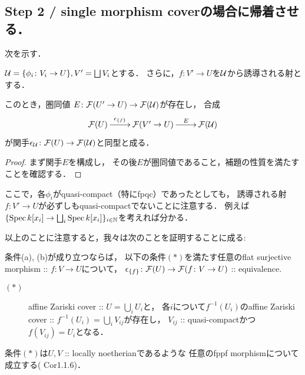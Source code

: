 \documentclass[a4paper, dvipdfmx]{jsarticle}
\begin{document}
\subsection{Step 2 / single morphism coverの場合に帰着させる．}
    次を示す．
    \begin{Lemma}
        $\mathcal{U}=\{\phi_i \colon V_i \to U\}, V'=\bigsqcup V_i$とする．
        さらに，$f \colon V' \to U$を$\mathcal{U}$から誘導される射とする．

        このとき，圏同値 $E \colon \mathcal{F}(U' \to U) \to \mathcal{F}(\mathcal{U})$が存在し，
        合成
        \[\xymatrix{
            \shF(U) \ar[r]^-{\epsilon_{\{f\}}}& \shF(V' \to U) \ar[r]^-{E}& \shF(\covU)
        }\]
        が関手$\epsilon_{\mathcal{U}} \colon \mathcal{F}(U) \to \mathcal{F}(\mathcal{U})$と同型と成る．
    \end{Lemma}

    \begin{proof}
        まず関手$E$を構成し，
        その後$E$が圏同値であること，補題の性質を満たすことを確認する．
    \end{proof}

    \begin{Remark}
        ここで，各$\phi_i$がquasi-compact（特にfpqc）であったとしても，
        誘導される射$f \colon V' \to U$が必ずしもquasi-compactでないことに注意する．
        例えば$\{\operatorname{Spec} k[x_i] \to \bigsqcup_i \operatorname{Spec} k[x_i]\}_{i \in \mathbb{N}}$を考えれば分かる．

        以上のことに注意すると，我々は次のことを証明することに成る:
        \begin{Lemma}
            条件(a), (b)が成り立つならば，
            以下の条件$(*)$を満たす任意のflat surjective morphism :: $f \colon V \to U$について，
            $\epsilon_{\{f\}} \colon \mathcal{F}(U) \to \mathcal{F}(f \colon V \to U)$ :: equivalence.
            \begin{description}
                \item[$(*)$]
                    affine Zariski cover :: $U=\bigcup_i U_i$と，
                    各$i$について$f^{-1}(U_i)$のaffine Zariski cover :: $f^{-1}(U_i)=\bigcup_i V_{ij}$が存在し，
                    $V_{ij}$ :: quasi-compactかつ$f(V_{ij})=U_i$となる．
            \end{description}
        \end{Lemma}
        条件$(*)$は$U, V$ :: locally noetherianであるような
        任意のfppf morphismについて成立する(\cite{ASS} Cor1.1.6)．
    \end{Remark}
\end{document}

